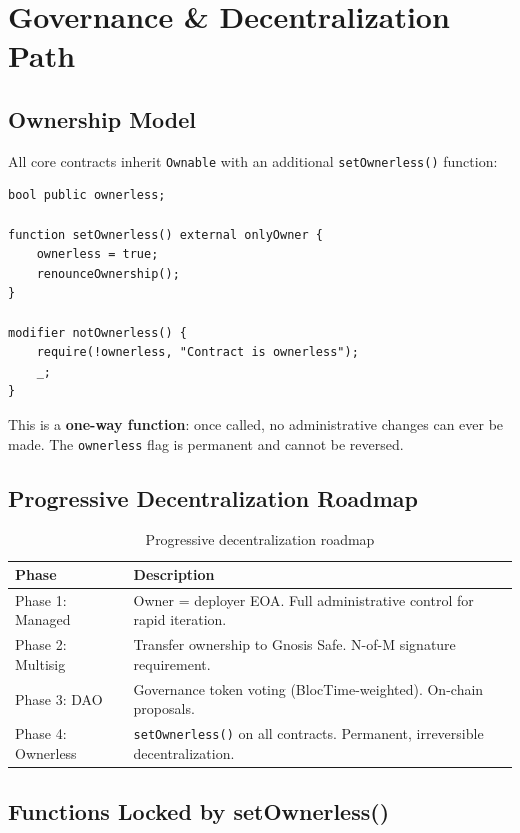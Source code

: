 \documentclass[11pt,a4paper]{article}
\begin{document}
\section{Governance \& Decentralization Path}
\label{sec:governance}

\subsection{Ownership Model}

All core contracts inherit \texttt{Ownable} with an additional \texttt{setOwnerless()} function:

\begin{lstlisting}[style=solidity]
bool public ownerless;

function setOwnerless() external onlyOwner {
    ownerless = true;
    renounceOwnership();
}

modifier notOwnerless() {
    require(!ownerless, "Contract is ownerless");
    _;
}
\end{lstlisting}

This is a \textbf{one-way function}: once called, no administrative changes can ever be made. The \texttt{ownerless} flag is permanent and cannot be reversed.

\subsection{Progressive Decentralization Roadmap}

\begin{table}[H]
\centering
\begin{tabularx}{\textwidth}{lX}
\toprule
\textbf{Phase} & \textbf{Description} \\
\midrule
Phase 1: Managed & Owner = deployer EOA. Full administrative control for rapid iteration. \\
Phase 2: Multisig & Transfer ownership to Gnosis Safe. N-of-M signature requirement. \\
Phase 3: DAO & Governance token voting (BlocTime-weighted). On-chain proposals. \\
Phase 4: Ownerless & \texttt{setOwnerless()} on all contracts. Permanent, irreversible decentralization. \\
\bottomrule
\end{tabularx}
\caption{Progressive decentralization roadmap}
\end{table}

\subsection{Functions Locked by setOwnerless()}
\end{document}
